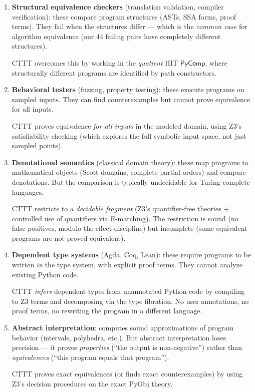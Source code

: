 \begin{enumerate}
  \item \textbf{Structural equivalence checkers} (translation
    validation, compiler verification): these compare program
    structures (ASTs, SSA forms, proof terms).  They fail when
    the structures differ --- which is the \emph{common case} for
    algorithm equivalence (our 44 failing pairs have completely
    different structures).

    CTTT overcomes this by working in the \emph{quotient} HIT
    $\mathsf{PyComp}$, where structurally different programs are
    identified by path constructors.

  \item \textbf{Behavioral testers} (fuzzing, property testing):
    these execute programs on sampled inputs.  They can find
    counterexamples but cannot prove equivalence for all inputs.

    CTTT proves equivalence \emph{for all inputs} in the modeled
    domain, using Z3's satisfiability checking (which explores the
    full symbolic input space, not just sampled points).

  \item \textbf{Denotational semantics} (classical domain theory):
    these map programs to mathematical objects (Scott domains,
    complete partial orders) and compare denotations.  But the
    comparison is typically undecidable for Turing-complete languages.

    CTTT restricts to a \emph{decidable fragment} (Z3's quantifier-free
    theories + controlled use of quantifiers via E-matching).  The
    restriction is sound (no false positives, modulo the effect
    discipline) but incomplete (some equivalent programs are not
    proved equivalent).

  \item \textbf{Dependent type systems} (Agda, Coq, Lean): these
    require programs to be written \emph{in} the type system, with
    explicit proof terms.  They cannot analyze existing Python code.

    CTTT \emph{infers} dependent types from unannotated Python code
    by compiling to Z3 terms and decomposing via the type fibration.
    No user annotations, no proof terms, no rewriting the program
    in a different language.

  \item \textbf{Abstract interpretation}: computes sound
    approximations of program behavior (intervals, polyhedra, etc.).
    But abstract interpretation loses precision --- it proves
    \emph{properties} (``the output is non-negative'') rather than
    \emph{equivalences} (``this program equals that program'').

    CTTT proves exact equivalences (or finds exact counterexamples)
    by using Z3's decision procedures on the exact PyObj theory.
\end{enumerate}

